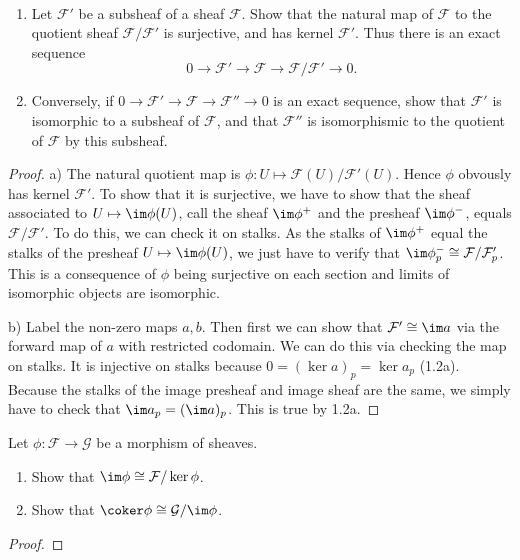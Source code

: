 \begin{exercise}%
	~
	\begin{enumerate}
		\item Let $\mathcal{F}' $ be a subsheaf of a sheaf $\mathcal{F} $. Show that the natural map of $\mathcal{F} $ to the quotient sheaf $\mathcal{F} / \mathcal{F}' $ is surjective, and has kernel $\mathcal{F}' $. Thus there is an exact sequence
		\[
			0 \to \mathcal{F}' \to \mathcal{F} \to \mathcal{F} / \mathcal{F}' \to 0
		.\] 
		\item Conversely, if $0 \to \mathcal{F}' \to \mathcal{F} \to \mathcal{F}''\to 0 $ is an exact sequence, show that $\mathcal{F}' $ is isomorphic to a subsheaf of $\mathcal{F} $, and that $\mathcal{F}'' $ is isomorphismic to the quotient of $\mathcal{F} $ by this subsheaf.
	\end{enumerate}
\end{exercise}
\begin{proof}
	a) 
	The natural quotient map is $\phi: U \mapsto \mathcal{F}(U) / \mathcal{F}'(U)$.
	Hence $\phi$ obvously has kernel $\mathcal{F}' $.
	To show that it is surjective, we have to show that the sheaf associated to $U\mapsto \im \phi(U) $, call the sheaf $\im \phi^+ $ and the presheaf $\im \phi^- $, equals $\mathcal{F} / \mathcal{F}' $.
	To do this, we can check it on stalks.
	As the stalks of $\im \phi^+ $ equal the stalks of the presheaf $U\mapsto \im \phi(U) $, we just have to verify that $\im \phi^-_p \cong \mathcal{F} / \mathcal{F}'_p$.
	This is a consequence of $\phi $ being surjective on each section and limits of isomorphic objects are isomorphic.

	b)
	Label the non-zero maps $a,b $.
	Then first we can show that $\mathcal{F}' \cong \im a $ via the forward map of $a $ with restricted codomain.
	We can do this via checking the map on stalks.
	It is injective on stalks because $0 = (\ker a)_p = \ker a_p$ (1.2a).
	Because the stalks of the image presheaf and image sheaf are the same, we simply have to check that $\im a_p = (\im a)_p $.
	This is true by 1.2a.
\end{proof}

\begin{exercise}%
	Let $\phi :\mathcal{F}\to \mathcal{G} $ be a morphism of sheaves.
	\begin{enumerate}
		\item Show that $\im \phi \cong \mathcal{F} / \ker \phi $.
		\item Show that $\coker \phi \cong \mathcal{G} / \im \phi $.
	\end{enumerate}
\end{exercise}
\begin{proof}
	
\end{proof}

